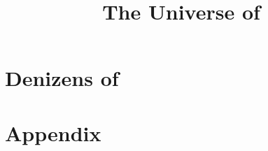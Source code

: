 \documentclass[a4paper,12pt,openany,oneside]{book}
\title{The Universe of \Miith}
\begin{document}
  \stuffatthebeginning



  \begin{comment}
    \part{The World of \Miith}
  \end{comment}
    
  \part{Denizens of \Miith}
    
    
    
    
    
    



  \begin{comment}
    \part{The Characters of \Miith}
  \end{comment}
    
    
    
    



  \begin{comment}
    \part{The Book Series of \Miith}
  \end{comment}
    
    
    
    
    \begin{comment}
       
       
    \end{comment}



  \part{Appendix}
    \appendix


    
    
    
    
    \begin{comment}
      
    \end{comment}



    
    \printindex
\end{document}
